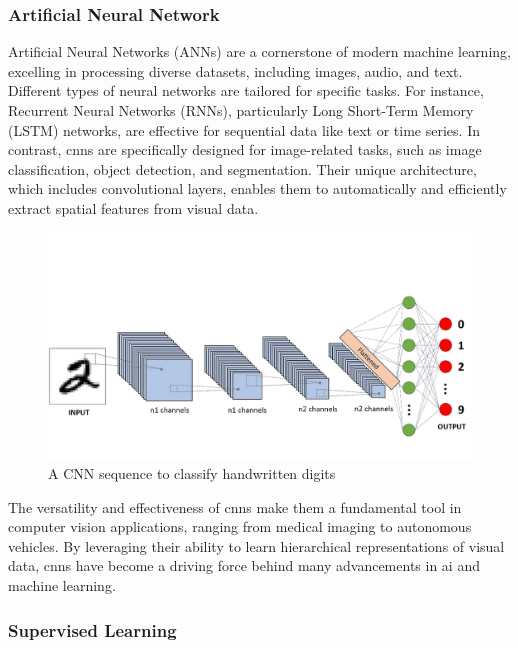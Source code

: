 \subsubsection*{Artificial Neural Network}
\label{subsubsec:artificial-neural-network}

Artificial Neural Networks (ANNs) are a cornerstone of modern machine learning, excelling in processing diverse datasets, including images, audio, and text. Different types of neural networks are tailored for specific tasks. For instance, Recurrent Neural Networks (RNNs), particularly Long Short-Term Memory (LSTM) networks, are effective for sequential data like text or time series. In contrast, \glspl{cnn} are specifically designed for image-related tasks, such as image classification, object detection, and segmentation. Their unique architecture, which includes convolutional layers, enables them to automatically and efficiently extract spatial features from visual data. \cite{geeksforgeeks:cnn} \\

\begin{figure}[h!]
    \centering
    \includegraphics[width=0.75\linewidth]{figures//theory/convolutional-neural-network.png}
    \caption{A CNN sequence to classify handwritten digits \cite{medium:cnn}}
    \label{fig:convolutional-neural-network}
\end{figure}

The versatility and effectiveness of \glspl{cnn} make them a fundamental tool in computer vision applications, ranging from medical imaging to autonomous vehicles. By leveraging their ability to learn hierarchical representations of visual data, \glspl{cnn} have become a driving force behind many advancements in \gls{ai} and machine learning.

\subsubsection*{Supervised Learning}
\label{subsubsec:supervised-learning}

